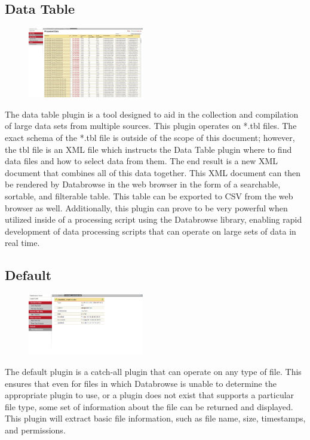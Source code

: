\documentclass[10pt]{article}
\begin{document}
\endgroup

\hfill \break
\hfill \break
\hfill \break
\hfill \break
\hfill \break
\hfill \break
\hfill \break
\hfill \break

\begingroup
\setlength\intextsep{0pt}
\subsection{Data Table}
\begin{figure}
		\includegraphics[width=0.45\textwidth]{Data_Table.png}
\end{figure}
The data table plugin is a tool designed to aid in the collection and compilation of large data sets from multiple sources.  This plugin operates on *.tbl files.  The exact schema of the *.tbl file is outside of the scope of this document; however, the tbl file is an XML file which instructs the Data Table plugin where to find data files and how to select data from them.  The end result is a new XML document that combines all of this data together.  This XML document can then be rendered by Databrowse in the web browser in the form of a searchable, sortable, and filterable table.  This table can be exported to CSV from the web browser as well.  Additionally, this plugin can prove to be very powerful when utilized inside of a processing script using the Databrowse library, enabling rapid development of data processing scripts that can operate on large sets of data in real time.  

\endgroup


\begingroup
\setlength\intextsep{0pt}
\subsection{Default}
\begin{figure}
		\includegraphics[width=0.45\textwidth]{Default_Plugin.png}
\end{figure}
The default plugin is a catch-all plugin that can operate on any type of file.  This ensures that even for files in which Databrowse is unable to determine the appropriate plugin to use, or a plugin does not exist that supports a particular file type, some set of information about the file can be returned and displayed.  This plugin will extract basic file information, such as file name, size, timestamps, and permissions.
\end{document}
